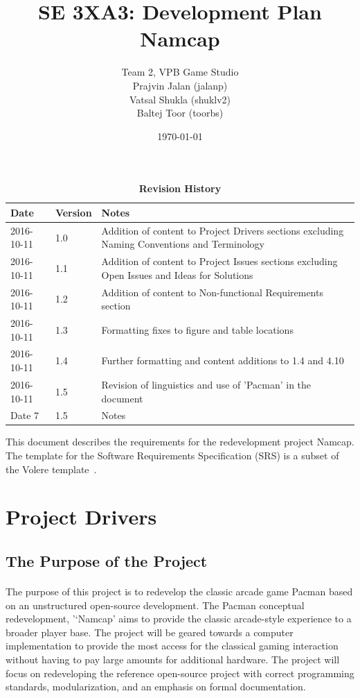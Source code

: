 \documentclass[12pt, titlepage]{article}
\title{SE 3XA3: Development Plan\\Namcap}
\author{Team 2, VPB Game Studio
		\\ Prajvin Jalan (jalanp)
		\\ Vatsal Shukla (shuklv2)
		\\ Baltej Toor (toorbs)
}
\date{\today}
\begin{document}
\maketitle

\tableofcontents
\listoftables
\listoffigures

\newpage

\begin{table}[H]
\caption{\bf Revision History}
\begin{tabularx}{\textwidth}{p{3cm}p{2cm}X}
\toprule {\bf Date} & {\bf Version} & {\bf Notes}\\
\midrule
2016-10-11 & 1.0 & Addition of content to Project Drivers sections excluding Naming Conventions and Terminology\\
2016-10-11 & 1.1 & Addition of content to Project Issues sections excluding Open Issues and Ideas for Solutions\\
2016-10-11 & 1.2 & Addition of content to Non-functional Requirements section\\
2016-10-11 & 1.3 & Formatting fixes to figure and table locations\\
2016-10-11 & 1.4 & Further formatting and content additions to 1.4 and 4.10\\
2016-10-11 & 1.5 & Revision of linguistics and use of 'Pacman' in the document\\
Date 7 & 1.5 & Notes\\
\bottomrule
\end{tabularx}
\end{table}

\newpage


This document describes the requirements for the redevelopment project Namcap.  The template for the Software
Requirements Specification (SRS) is a subset of the Volere
template~\citep{RobertsonAndRobertson2012}.

\section{Project Drivers}

\subsection{The Purpose of the Project}
\paragraph{}
The purpose of this project is to redevelop the classic arcade game Pacman based on an unstructured open-source development. The Pacman conceptual redevelopment, '‘Namcap' aims to provide the classic arcade-style experience to a broader player base. The project will be geared towards a computer implementation to provide the most access for the classical gaming interaction without having to pay large amounts for additional hardware. The project will focus on redeveloping the reference open-source project with correct programming standards, modularization, and an emphasis on formal documentation.
\end{document}
